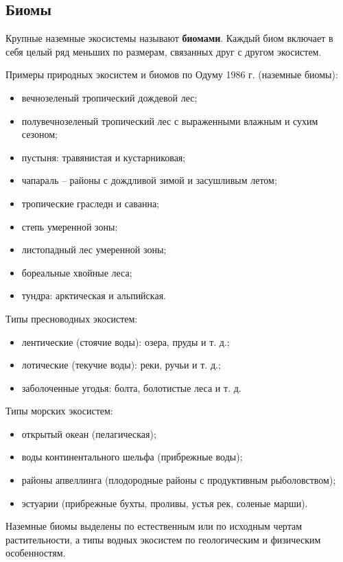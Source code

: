 \documentclass[a5paper, 11pt]{extarticle}
\theoremstyle{definition}
\theoremstyle{definition}
\theoremstyle{definition}
\numberwithin{figure}{section}
\begin{document}
\subsection{Биомы}

Крупные наземные экосистемы называют \textbf{биомами}. Каждый биом включает в себя целый ряд меньших по размерам, связанных друг с другом экосистем.

Примеры природных экосистем и биомов по Одуму 1986 г. (наземные биомы):
\begin{itemize}
    \item вечнозеленый тропический дождевой лес;
    \item полувечнозеленый тропический лес с выраженными влажным и сухим сезоном;
    \item пустыня: травянистая и кустарниковая;
    \item чапараль -- районы с дождливой зимой и засушливым летом;
    \item тропические граследн и саванна;
    \item степь умеренной зоны;
    \item листопадный лес умеренной зоны;
    \item бореальные хвойные леса;
    \item тундра: арктическая и альпийская.
\end{itemize}
Типы пресноводных экосистем:
\begin{itemize}
    \item лентические (стоячие воды): озера, пруды и т. д.;
    \item лотические (текучие воды): реки, ручьи и т. д.;
    \item заболоченные угодья: болта, болотистые леса и т. д.
\end{itemize}
Типы морских экосистем:
\begin{itemize}
    \item открытый океан (пелагическая);
    \item воды континентального шельфа (прибрежные воды);
    \item районы апвеллинга (плодородные районы с продуктивным рыболовством);
    \item эстуарии (прибрежные бухты, проливы, устья рек, соленые марши).
\end{itemize}

Наземные биомы выделены по естественным или по исходным чертам растительности, а типы водных экосистем по геологическим и физическим особенностям.
\end{document}
